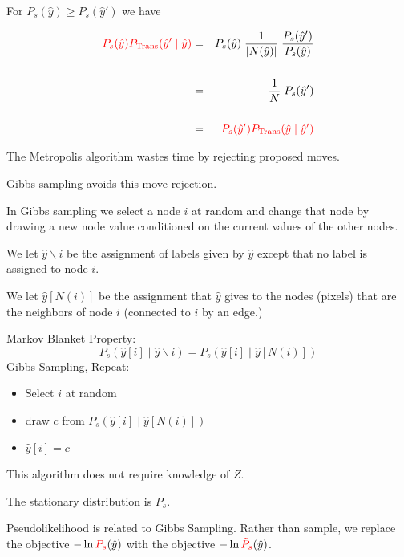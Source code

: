 {For $P_s(\hat{y}) \geq P_s(\hat{y}')$ we have

\begin{eqnarray*}
{\color{red} P_s(\hat{y})P_{\mathrm{Trans}}(\hat{y}'\;|\;\hat{y})} & = & P_s(\hat{y})\;\frac{1}{|N(\hat{y})|}\;\frac{P_s(\hat{y}')}{P_s(\hat{y})} \\
\\
& = & \frac{1}{N}\;P_s(\hat{y}') \\
\\
& = & {\color{red} P_s(\hat{y}')P_{\mathrm{Trans}}(\hat{y}\;|\;\hat{y}')}
\end{eqnarray*}


The Metropolis algorithm wastes time by rejecting proposed moves.

\vfill
Gibbs sampling avoids this move rejection.

\vfill
In Gibbs sampling we select a node $i$ at random and change that node by drawing a new node value conditioned on the current values of the other nodes.

\vfill
We let {\color{red} $\hat{y} \backslash i$} be the assignment of labels given by $\hat{y}$ except that no label is assigned to node $i$.

\vfill
We let {\color{red} $\hat{y}[N(i)]$} be the assignment that $\hat{y}$ gives to the nodes (pixels) that are the neighbors of node $i$ (connected to $i$ by an edge.)


Markov Blanket Property:
{\color{red} $$P_s(\hat{y}[i] \;|\;\hat{y} \backslash i) = P_s(\hat{y}[i] \;|\; \hat{y}[N(i)])$$}
\vfill
Gibbs Sampling, Repeat:

\begin{itemize}
\item   Select $i$ at random

\item draw $c$ from $P_s(\hat{y}[i] \;|\;\hat{y}[N(i)])$

\item $\hat{y}[i] = c$
\end{itemize}

\vfill
This algorithm does not require knowledge of $Z$.

\vfill
The stationary distribution is $P_s$.


Pseudolikelihood is related to Gibbs Sampling.  Rather than sample, we replace the objective
$- \ln {\color{red} P_s}(\hat{y})$ with the objective $- \ln {\color{red} \tilde{P}_s}(\hat{y})$.

}
